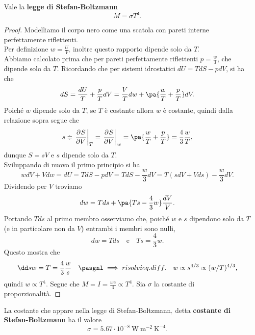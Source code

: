 \begin{theorem}\label{LeggeStefanBoltzmann}
Vale la \textbf{legge di Stefan-Boltzmann}
\[M=\sigma T^4.\]
\end{theorem}
\begin{proof}
Modelliamo il corpo nero come una scatola con pareti interne perfettamente riflettenti.\\
Per definizione $w=\frac UV$, inoltre questo rapporto dipende solo da $T$.\\ Abbiamo calcolato prima che per pareti perfettamente riflettenti $p=\frac w3$, che dipende solo da $T$. Ricordando che per sistemi idrostatici $dU=TdS-pdV$, si ha che
\[dS=\frac {dU}T+\frac pTdV=\frac VTdw+\pa{\frac wT+\frac pT}dV.\]
Poich\'e $w$ dipende solo da $T$, se $T$ \`e costante allora $w$ \`e costante, quindi dalla relazione sopra segue che
\[s\doteqdot\ppb VST=\ppb VSw=\pa{\frac wT+\frac pT}=\frac 43 \frac wT,\]
dunque $S=sV$ e $s$ dipende solo da $T$.\\
Sviluppando di nuovo il primo principio si ha
\[wdV+Vdw=dU=TdS-pdV=TdS-\frac w3dV=T(sdV+Vds)-\frac w3dV.\]
Dividendo per $V$ troviamo
\[dw=Tds+\pa{Ts-\frac 43w}\frac{dV}V.\]
Portando $Tds$ al primo membro osserviamo che,
poich\'e $w$ e $s$ dipendono solo da $T$ (e in particolare non da $V$) entrambi i membri sono nulli, 
\[dw=Tds\quad\text{e}\quad Ts=\frac 43w.\]
Questo mostra che
\[\dd sw=T=\frac 43\frac ws\quad\pasgnl\implies{risolvi eq. diff.}\quad w\propto s^{4/3}\propto (w/T)^{4/3},\]
quindi $w\propto T^4$.
Segue che $M=I=\frac{wc}4\propto T^4$. Sia $\sigma$ la costante di proporzionalit\`a.
\end{proof}

\begin{fact}
La costante che appare nella legge di Stefan-Boltzmann, detta \textbf{costante di Stefan-Boltzmann} ha il valore
\[\sigma=5.67\cdot 10^{-8} \ \mathrm{W}\ \mathrm{m}^{-2}\ \mathrm{K}^{-4}.\]
\end{fact}